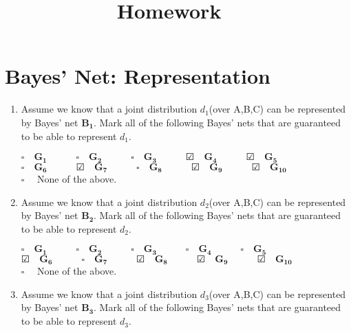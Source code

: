 \documentclass[11pt, answers]{exam}
\title{Homework \hmwkNumber\ \hmwkType}
\date{\hmwkDue}
\begin{document}
\maketitle

\section{Bayes' Net: Representation}


\begin{enumerate}
\item Assume we know that a joint distribution $d_1$(over A,B,C) can be represented by Bayes' net $\mathbf{B_1}$. Mark all of the following Bayes' nets that are guaranteed to be able to represent $d_1$.

$\square \quad \mathbf{G_1} \quad   \quad \quad \square \quad \mathbf{G_2} \quad \quad \quad \square  \quad\mathbf{G_3} \quad \quad \quad \CheckedBox \quad \mathbf{G_4} \quad \quad \quad \CheckedBox  \quad \mathbf{G_5}$\\

$\square \quad \mathbf{G_6} \quad   \quad \quad \CheckedBox \quad \mathbf{G_7} \quad \quad \quad \square  \quad\mathbf{G_8} \quad \quad \quad \CheckedBox \quad \mathbf{G_9} \quad \quad \quad \CheckedBox  \quad \mathbf{G_{10}}$\\

$\square \quad $ None of the above.



\item Assume we know that a joint distribution $d_2$(over A,B,C) can be represented by Bayes' net $\mathbf{B_2}$. Mark all of the following Bayes' nets that are guaranteed to be able to represent $d_2$.

$\square \quad \mathbf{G_1} \quad   \quad \quad \square \quad \mathbf{G_2} \quad \quad \quad \square  \quad\mathbf{G_3} \quad \quad \quad \square \quad \mathbf{G_4} \quad \quad \quad \square  \quad \mathbf{G_5}$\\

$\CheckedBox \quad \mathbf{G_6} \quad   \quad \quad \square \quad \mathbf{G_7} \quad \quad \quad \CheckedBox  \quad\mathbf{G_8} \quad \quad \quad \CheckedBox \quad \mathbf{G_9} \quad \quad \quad \CheckedBox  \quad \mathbf{G_{10}}$\\

$\square \quad $ None of the above.

\item Assume we know that a joint distribution $d_3$(over A,B,C) can be represented by Bayes' net $\mathbf{B_3}$. Mark all of the following Bayes' nets that are guaranteed to be able to represent $d_3$.


\end{enumerate}
\end{document}
